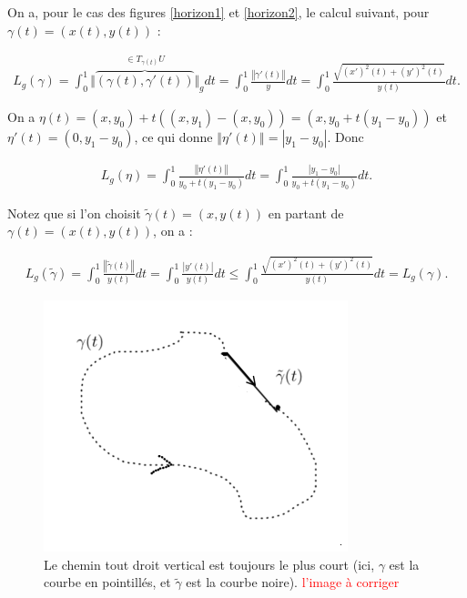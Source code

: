 \documentclass[french]{article}
\theoremstyle{definition}
\begin{document}
On a, pour le cas des figures \ref{horizon1} et \ref{horizon2}, le calcul suivant, pour \(\gamma(t) = (x(t), y(t))\) :

\begin{gather*}
  L_g(\gamma) = \int_{0}^{1}  \Vert \overbrace{(\gamma(t), \gamma'(t))}^{\in T _{{\gamma}(t)}U} \Vert_g  dt = \int_{0}^{1} \frac{\left\Vert \gamma'(t) \right\Vert }{y}dt = \int_{0}^{1} \frac{\sqrt{(x')^2(t)+ (y')^2(t)}}{y(t)} dt.
\end{gather*}

On a \(\eta(t) = (x,y_0) + t((x,y_1)-(x,y_0)) = (x,y_0 + t(y_1 - y_0))\) et \(\eta'(t) = (0,y_1-y_0)\), ce qui donne \(\left\Vert \eta'(t)\right\Vert   = \left\lvert y_1 - y_0 \right\rvert  \). Donc

\begin{gather*}
  L_g(\eta) = \int_{0}^{1} \frac{\left\Vert \eta'(t) \right\Vert }{y_0 + t(y_1-y_0)}dt = \int_{0}^{1} \frac{\left\lvert y_1-y_0 \right\rvert}{y_0 + t(y_1-y_0)}dt.
\end{gather*}

Notez que si l'on choisit \(\tilde{\gamma}(t)=(x,y(t))\) en partant de \(\gamma(t) = (x(t),y(t))\), on a :

\begin{gather*}
  L_g(\tilde{\gamma}) = \int_{0}^{1} \frac{\left\Vert \tilde{\gamma}(t) \right\Vert }{y(t)}dt = \int_{0}^{1} \frac{\left\lvert y'(t) \right\rvert}{y(t)}dt \leq  \int_{0}^{1} \frac{\sqrt{(x')^2(t) + (y')^2(t)}}{y(t)}dt = L_g(\gamma).
\end{gather*}

\begin{figure}[h!]
  \centering
  \includegraphics[scale=0.4, angle=-41]{figures/chemin-vert-court-corr2.png}
  \caption{Le chemin tout droit vertical est toujours le plus court (ici, \(\gamma\) est la courbe en pointillés, et \(\widetilde{\gamma}\) est la courbe noire). \textcolor{red}{l'image \`a corriger}}
  \label{chemin-vert-court}
\end{figure}
\end{document}
